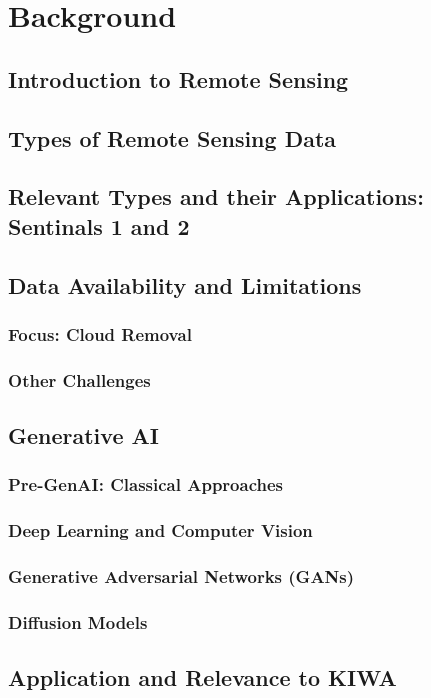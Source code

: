 \chapter{Background}

\section{Introduction to Remote Sensing}

\section{Types of Remote Sensing Data}

\section{Relevant Types and their Applications: Sentinals 1 and 2}

\section{Data Availability and Limitations}

\subsection{Focus: Cloud Removal}

\subsection{Other Challenges}

\section{Generative AI}
\subsection{Pre-GenAI: Classical Approaches}
\subsection{Deep Learning and Computer Vision}
\subsection{Generative Adversarial Networks (GANs)}
\subsection{Diffusion Models}

\section{Application and Relevance to KIWA}


